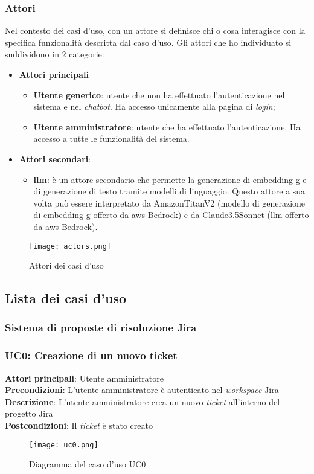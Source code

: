 \subsubsection{Attori}
Nel contesto dei casi d'uso, con un attore si definisce chi o cosa interagisce con la specifica funzionalità descritta dal caso d'uso.
Gli attori che ho individuato si suddividono in 2 categorie:
\begin{itemize}
    \item \textbf{Attori principali} \begin{itemize} \item \textbf{Utente generico}: utente che non ha effettuato l'autenticazione nel sistema e nel \textit{chatbot}. Ha accesso unicamente alla pagina di \textit{login}; \item \textbf{Utente amministratore}: utente che ha effettuato l'autenticazione. Ha accesso a tutte le funzionalità del sistema.
    \end{itemize}
    \item \textbf{Attori secondari}: \begin{itemize} \item \textbf{\gls{llm}}: è un attore secondario che permette la generazione di \gls{embedding-g} e di generazione di testo tramite modelli di linguaggio. Questo attore a sua volta può essere interpretato da AmazonTitanV2 (modello di generazione di \gls{embedding-g} offerto da \gls{aws} Bedrock) e da Claude3.5Sonnet (\gls{llm} offerto da \gls{aws} Bedrock).
    \end{itemize}
\end{itemize}
\begin{figure}[H]
    \centering
    \texttt{[image: actors.png]}
    \caption{Attori dei casi d'uso}
    \label{fig:attori}
\end{figure}
\subsection*{Lista dei casi d'uso}
\subsubsection{Sistema di proposte di risoluzione Jira}
\subsubsection{UC0: Creazione di un nuovo ticket}
\textbf{Attori principali}: Utente amministratore \\
\textbf{Precondizioni}: L'utente amministratore è autenticato nel \textit{workspace} Jira\\
\textbf{Descrizione}: L'utente amministratore crea un nuovo \textit{ticket} all'interno del progetto Jira \\
\textbf{Postcondizioni}: Il \textit{ticket} è stato creato \\
\begin{figure}[H]
    \centering
    \texttt{[image: uc0.png]}
    \caption{Diagramma del caso d'uso UC0}
    \label{fig:UC0}
\end{figure}
